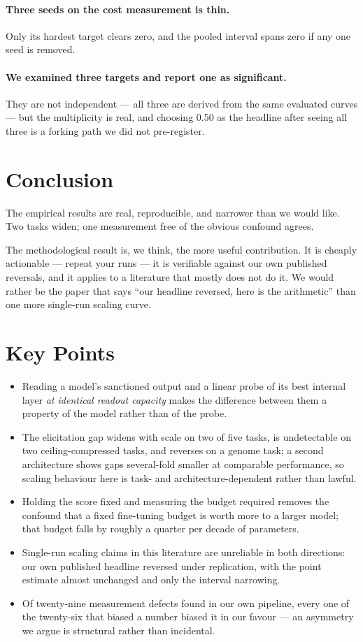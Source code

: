 \documentclass[11pt]{article}
\begin{document}
\paragraph{Three seeds on the cost measurement is thin.} Only its hardest target
clears zero, and the pooled interval spans zero if any one seed is removed.

\paragraph{We examined three targets and report one as significant.} They are not
independent --- all three are derived from the same evaluated curves --- but the
multiplicity is real, and choosing 0.50 as the headline after seeing all three is
a forking path we did not pre-register.

\section{Conclusion}

The empirical results are real, reproducible, and narrower than we would like.
Two tasks widen; one measurement free of the obvious confound agrees.

The methodological result is, we think, the more useful contribution. It is
cheaply actionable --- repeat your runs --- it is verifiable against our own
published reversals, and it applies to a literature that mostly does not do it. We
would rather be the paper that says ``our headline reversed, here is the
arithmetic'' than one more single-run scaling curve.


\section*{Key Points}
\begin{itemize}
\itemsep2pt
\item Reading a model's sanctioned output and a linear probe of its best internal
layer \emph{at identical readout capacity} makes the difference between them a
property of the model rather than of the probe.
\item The elicitation gap widens with scale on two of five tasks, is undetectable
on two ceiling-compressed tasks, and reverses on a genome task; a second
architecture shows gaps several-fold smaller at comparable performance, so
scaling behaviour here is task- and architecture-dependent rather than lawful.
\item Holding the score fixed and measuring the budget required removes the
confound that a fixed fine-tuning budget is worth more to a larger model; that
budget falls by roughly a quarter per decade of parameters.
\item Single-run scaling claims in this literature are unreliable in both
directions: our own published headline reversed under replication, with the point
estimate almost unchanged and only the interval narrowing.
\item Of twenty-nine measurement defects found in our own pipeline, every one of
the twenty-six that biased a number biased it in our favour --- an asymmetry we
argue is structural rather than incidental.
\end{itemize}
\end{document}
